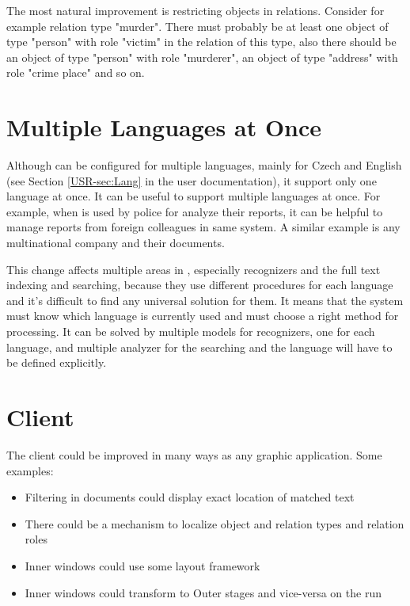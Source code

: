 The most natural improvement is restricting objects in relations. Consider for
example relation type "murder". There must probably be at least one object of
type "person" with role "victim" in the relation of this type, also there
should be an object of type "person" with role "murderer", an object of type
"address" with role "crime place" and so on.

\section{Multiple Languages at Once}
Although \textan{} can be configured for multiple languages, mainly for Czech
and English (see Section \ref{USR-sec:Lang} in the user documentation), it support
only one language at once. It can be useful to support multiple languages at once.
For example, when \textan{} is used by police for analyze their reports, it can
be helpful to manage reports from foreign colleagues in same system. A similar
example is any multinational company and their documents.

This change affects multiple areas in \textan{}, especially recognizers and
the full text indexing and searching, because they use different procedures for
each language and it's difficult to find any universal solution for them. It means
that the system must know which language is currently used and must choose a right
method for processing. It can be solved by multiple models for recognizers, one
for each language, and multiple analyzer for the searching and the language will
have to be defined explicitly.

\section{Client}
The \textan{} client could be improved in many ways as any graphic application.
Some examples:

\begin{itemize}
	\item Filtering in documents could display exact location of matched text
	\item There could be a mechanism to localize object and relation types and
	relation roles
	\item Inner windows could use some layout framework
	\item Inner windows could transform to Outer stages and vice-versa on the
	run
\end{itemize}
